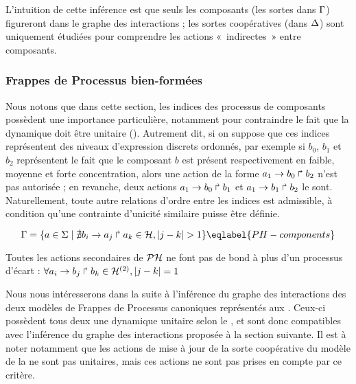 L'intuition de cette inférence est que seuls les composants (les sortes dans $\mathrm{\Gamma}$)
figureront dans le graphe des interactions ;
les sortes coopératives (dans $\Delta$) sont uniquement étudiées pour comprendre les actions
«~indirectes~» entre composants.



\subsubsection{Frappes de Processus bien-formées}

Nous notons que dans cette section, les indices des processus de composants
possèdent une importance particulière,
notamment pour contraindre le fait que la dynamique doit être unitaire ().
Autrement dit, si on suppose que ces indices représentent des niveaux d'expression discrets
ordonnés,
par exemple si $b_0$, $b_1$ et $b_2$ représentent le fait que le composant $b$
est présent respectivement en faible, moyenne et forte concentration,
alors une action de la forme $a_1\rightarrow b_0\Rsh b_2$ n'est pas autorisée ;
en revanche, deux actions $a_1\rightarrow b_0\Rsh b_1$ et $a_1\rightarrow b_1\Rsh b_2$ le sont.
Naturellement, toute autre relations d'ordre entre les indices est admissible,
à condition qu'une contrainte d'unicité similaire puisse être définie.

\begin{equation}
\components = \{a \in \PHs \mid \nexists \PHfrappe{b_i}{a_j}{a_k} \in \PHa, |j - k| > 1\} \\
\eqlabel{PH-components}
\end{equation}

\begin{critere}
  Toutes les actions secondaires de $\mathcal{PH}$ ne font pas de bond
  à plus d'un processus d'écart :
  $\forall a_i\rightarrow b_j\Rsh b_k \in \mathcal{H}^{(2)}, |j - k| = 1$
\end{critere}

\begin{example}
  Nous nous intéresserons dans la suite à l'inférence du graphe des interactions des deux
  modèles de Frappes de Processus canoniques représentés
  aux .
  Ceux-ci possèdent tous deux une dynamique unitaire selon le ,
  et sont donc compatibles
  avec l'inférence du graphe des interactions proposée à la section suivante.
  Il est à noter notamment que les actions de mise à jour de la sorte coopérative
  du modèle de la  ne sont pas unitaires, mais ces actions ne sont pas prises
  en compte par ce critère.
\end{example}

